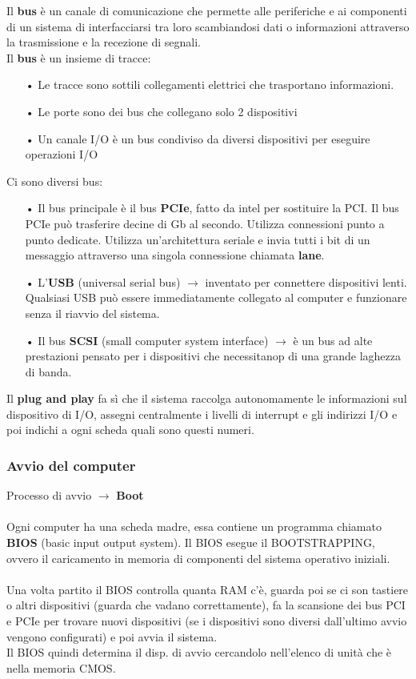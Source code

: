 \documentclass{article}
\begin{document}
Il \textbf{bus} è un canale di comunicazione che permette alle periferiche e ai componenti di un sistema di interfacciarsi tra loro 
scambiandosi dati o informazioni attraverso la trasmissione e la recezione di segnali.
\\
Il \textbf{bus} è un insieme di tracce: 
\begin{enumerate}
   \item[•] Le tracce sono sottili collegamenti elettrici che trasportano informazioni.
   \item[•] Le porte sono dei bus che collegano solo 2 dispositivi 
   \item[•] Un canale I/O è un bus condiviso da diversi dispositivi per eseguire operazioni I/O 
\end{enumerate}

Ci sono diversi bus:
\begin{enumerate}
   \item[•] Il bus principale è il bus \textbf{PCIe}, fatto da intel per sostituire la PCI. Il bus PCIe può trasferire 
      decine di Gb al secondo. Utilizza connessioni punto a punto dedicate. Utilizza un'architettura seriale e invia tutti i bit 
      di un messaggio attraverso una singola connessione chiamata \textbf{lane}.
   \item[•] L'\textbf{USB} (universal serial bus) $\rightarrow$ inventato per connettere dispositivi lenti. Qualsiasi USB può essere immediatamente collegato al computer e funzionare 
      senza il riavvio del sistema.
   \item[•] Il bus \textbf{SCSI} (small computer system interface) $\rightarrow$ è un bus ad alte prestazioni pensato per i dispositivi che necessitanop di una grande laghezza di banda.
\end{enumerate}

Il \textbf{plug and play} fa sì che il sistema raccolga autonomamente le informazioni sul dispositivo di I/O, assegni centralmente i livelli di interrupt e gli indirizzi I/O 
e poi indichi a ogni scheda quali sono questi numeri.

\subsubsection{Avvio del computer}
Processo di avvio $\rightarrow$ \textbf{Boot}
\\
\\
Ogni computer ha una scheda madre, essa contiene un programma chiamato \textbf{BIOS} (basic input output system). Il BIOS esegue il BOOTSTRAPPING, ovvero 
il caricamento in memoria di componenti del sistema operativo iniziali.
\\
\\
Una volta partito il BIOS controlla quanta RAM c'è, guarda poi se ci son tastiere o altri dispositivi (guarda che vadano correttamente), fa la 
scansione dei bus PCI e PCIe per trovare nuovi dispositivi (se i dispositivi sono diversi dall'ultimo avvio vengono configurati) e poi avvia il sistema. 
\\Il BIOS quindi determina il disp. di avvio cercandolo nell'elenco di unità che è nella memoria CMOS.
\end{document}
